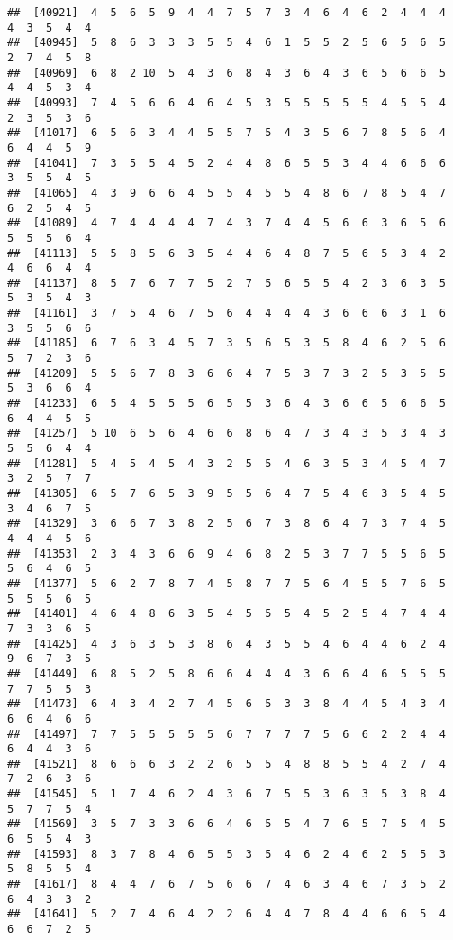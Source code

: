 \documentclass[
]{book}
\begin{document}
\begin{verbatim}
##  [40921]  4  5  6  5  9  4  4  7  5  7  3  4  6  4  6  2  4  4  4  4  3  5  4  4
##  [40945]  5  8  6  3  3  3  5  5  4  6  1  5  5  2  5  6  5  6  5  2  7  4  5  8
##  [40969]  6  8  2 10  5  4  3  6  8  4  3  6  4  3  6  5  6  6  5  4  4  5  3  4
##  [40993]  7  4  5  6  6  4  6  4  5  3  5  5  5  5  5  4  5  5  4  2  3  5  3  6
##  [41017]  6  5  6  3  4  4  5  5  7  5  4  3  5  6  7  8  5  6  4  6  4  4  5  9
##  [41041]  7  3  5  5  4  5  2  4  4  8  6  5  5  3  4  4  6  6  6  3  5  5  4  5
##  [41065]  4  3  9  6  6  4  5  5  4  5  5  4  8  6  7  8  5  4  7  6  2  5  4  5
##  [41089]  4  7  4  4  4  4  7  4  3  7  4  4  5  6  6  3  6  5  6  5  5  5  6  4
##  [41113]  5  5  8  5  6  3  5  4  4  6  4  8  7  5  6  5  3  4  2  4  6  6  4  4
##  [41137]  8  5  7  6  7  7  5  2  7  5  6  5  5  4  2  3  6  3  5  5  3  5  4  3
##  [41161]  3  7  5  4  6  7  5  6  4  4  4  4  3  6  6  6  3  1  6  3  5  5  6  6
##  [41185]  6  7  6  3  4  5  7  3  5  6  5  3  5  8  4  6  2  5  6  5  7  2  3  6
##  [41209]  5  5  6  7  8  3  6  6  4  7  5  3  7  3  2  5  3  5  5  5  3  6  6  4
##  [41233]  6  5  4  5  5  5  6  5  5  3  6  4  3  6  6  5  6  6  5  6  4  4  5  5
##  [41257]  5 10  6  5  6  4  6  6  8  6  4  7  3  4  3  5  3  4  3  5  5  6  4  4
##  [41281]  5  4  5  4  5  4  3  2  5  5  4  6  3  5  3  4  5  4  7  3  2  5  7  7
##  [41305]  6  5  7  6  5  3  9  5  5  6  4  7  5  4  6  3  5  4  5  3  4  6  7  5
##  [41329]  3  6  6  7  3  8  2  5  6  7  3  8  6  4  7  3  7  4  5  4  4  4  5  6
##  [41353]  2  3  4  3  6  6  9  4  6  8  2  5  3  7  7  5  5  6  5  5  6  4  6  5
##  [41377]  5  6  2  7  8  7  4  5  8  7  7  5  6  4  5  5  7  6  5  5  5  5  6  5
##  [41401]  4  6  4  8  6  3  5  4  5  5  5  4  5  2  5  4  7  4  4  7  3  3  6  5
##  [41425]  4  3  6  3  5  3  8  6  4  3  5  5  4  6  4  4  6  2  4  9  6  7  3  5
##  [41449]  6  8  5  2  5  8  6  6  4  4  4  3  6  6  4  6  5  5  5  7  7  5  5  3
##  [41473]  6  4  3  4  2  7  4  5  6  5  3  3  8  4  4  5  4  3  4  6  6  4  6  6
##  [41497]  7  7  5  5  5  5  5  6  7  7  7  7  5  6  6  2  2  4  4  6  4  4  3  6
##  [41521]  8  6  6  6  3  2  2  6  5  5  4  8  8  5  5  4  2  7  4  7  2  6  3  6
##  [41545]  5  1  7  4  6  2  4  3  6  7  5  5  3  6  3  5  3  8  4  5  7  7  5  4
##  [41569]  3  5  7  3  3  6  6  4  6  5  5  4  7  6  5  7  5  4  5  6  5  5  4  3
##  [41593]  8  3  7  8  4  6  5  5  3  5  4  6  2  4  6  2  5  5  3  5  8  5  5  4
##  [41617]  8  4  4  7  6  7  5  6  6  7  4  6  3  4  6  7  3  5  2  6  4  3  3  2
##  [41641]  5  2  7  4  6  4  2  2  6  4  4  7  8  4  4  6  6  5  4  6  6  7  2  5

\end{verbatim}
\end{document}
